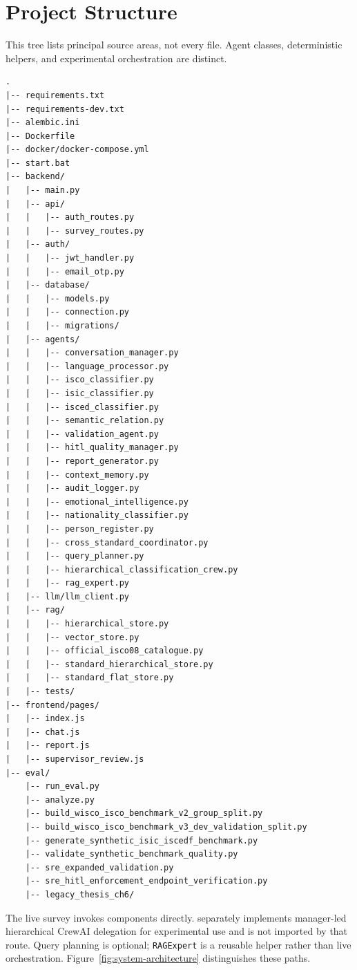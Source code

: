 \chapter{Project Structure}
\label{app:structure}

This tree lists principal source areas, not every file. Agent classes,
deterministic helpers, and experimental orchestration are distinct.

\begin{lstlisting}[caption={Principal implementation and evaluation source areas.}]
.
|-- requirements.txt
|-- requirements-dev.txt
|-- alembic.ini
|-- Dockerfile
|-- docker/docker-compose.yml
|-- start.bat
|-- backend/
|   |-- main.py
|   |-- api/
|   |   |-- auth_routes.py
|   |   |-- survey_routes.py
|   |-- auth/
|   |   |-- jwt_handler.py
|   |   |-- email_otp.py
|   |-- database/
|   |   |-- models.py
|   |   |-- connection.py
|   |   |-- migrations/
|   |-- agents/
|   |   |-- conversation_manager.py
|   |   |-- language_processor.py
|   |   |-- isco_classifier.py
|   |   |-- isic_classifier.py
|   |   |-- isced_classifier.py
|   |   |-- semantic_relation.py
|   |   |-- validation_agent.py
|   |   |-- hitl_quality_manager.py
|   |   |-- report_generator.py
|   |   |-- context_memory.py
|   |   |-- audit_logger.py
|   |   |-- emotional_intelligence.py
|   |   |-- nationality_classifier.py
|   |   |-- person_register.py
|   |   |-- cross_standard_coordinator.py
|   |   |-- query_planner.py
|   |   |-- hierarchical_classification_crew.py
|   |   |-- rag_expert.py
|   |-- llm/llm_client.py
|   |-- rag/
|   |   |-- hierarchical_store.py
|   |   |-- vector_store.py
|   |   |-- official_isco08_catalogue.py
|   |   |-- standard_hierarchical_store.py
|   |   |-- standard_flat_store.py
|   |-- tests/
|-- frontend/pages/
|   |-- index.js
|   |-- chat.js
|   |-- report.js
|   |-- supervisor_review.js
|-- eval/
    |-- run_eval.py
    |-- analyze.py
    |-- build_wisco_isco_benchmark_v2_group_split.py
    |-- build_wisco_isco_benchmark_v3_dev_validation_split.py
    |-- generate_synthetic_isic_iscedf_benchmark.py
    |-- validate_synthetic_benchmark_quality.py
    |-- sre_expanded_validation.py
    |-- sre_hitl_enforcement_endpoint_verification.py
    |-- legacy_thesis_ch6/
\end{lstlisting}

The live survey invokes components directly.
 separately implements
manager-led hierarchical CrewAI delegation for experimental use and is
not imported by that route. Query planning is optional;
\texttt{RAGExpert} is a reusable helper rather than live orchestration.
Figure~\ref{fig:system-architecture} distinguishes these paths.

